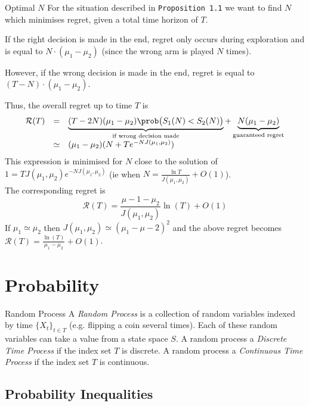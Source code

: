 \documentclass[11pt,a4paper]{article}
\begin{document}
\begin{proposition}{Optimal $N$}
  For the situation described in \texttt{Proposition 1.1} we want to find $N$ which minimises regret, given a total time horizon of $T$.
  \par If the right decision is made in the end, regret only occurs during exploration and is equal to $N\cdot(\mu_1-\mu_2)$ (since the wrong arm is played $N$ times).
  \par However, if the wrong decision is made in the end, regret is equal to $(T-N)\cdot(\mu_1-\mu_2)$.
  \par Thus, the overall regret up to time $T$ is
  \[\begin{array}{rcl}
    \mathcal{R}(T)&=&\underbrace{(T-2N)(\mu_1-\mu_2)\prob\big(S_1(N)<S_2(N)\big)}_{\small\text{if wrong decision made}}+\underbrace{N(\mu_1-\mu_2)}_{\small\text{guaranteed regret}}\\
    &\simeq&(\mu_1-\mu_2)(N+Te^{-NJ(\mu_1,\mu_2)})
  \end{array}\]
  This expression is minimised for $N$ close to the solution of $1=TJ(\mu_1,\mu_2)e^{-NJ(\mu_1,\mu_2)}$ (ie when $N=\frac{\ln T}{J(\mu_1,\mu_2)}+O(1)$).\\
  The corresponding regret is
  \[ \mathcal{R}(T)=\frac{\mu-1-\mu_2}{J(\mu_1,\mu_2)}\ln(T)+O(1) \]
  If $\mu_1\simeq\mu_2$ then $J(\mu_1,\mu_2)\simeq(\mu_1-\mu-2)^2$ and the above regret becomes $\mathcal{R}(T)=\frac{\ln(T)}{\mu_1-\mu_2}+O(1)$.
\end{proposition}

\section{Probability}

\begin{definition}{Random Process}
  A \textit{Random Process} is a collection of random variables indexed by time $\{X_t\}_{t\in T}$ (e.g. flipping a coin several times). Each of these random variables can take a value from a state space $S$. A random process a \textit{Discrete Time Process} if the index set $T$ is discrete. A random process a \textit{Continuous Time Process} if the index set $T$ is continuous.
\end{definition}

\subsection{Probability Inequalities}
\end{document}
